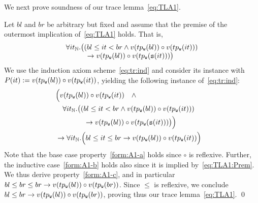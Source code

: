 We next prove soundness of our trace lemma~\eqref{eq:TLA1}.

Let $bl$ and $br$ be arbitrary but fixed and assume that the 
premise of the outermost implication of~\eqref{eq:TLA1}
holds. That is, 
\begin{equation}\label{eq:TLA1:Prem}
\begin{array}{l}
\forall it_{\mathbb{N}}.  \big(( bl\leq it < br \land v(tp_{\texttt{w}}(bl)) \circ v(tp_{\texttt{w}}(it))) \\
\qquad\quad\rightarrow v(tp_{\texttt{w}}(bl)) \circ
v(tp_{\texttt{w}}({\tt s}(it)))\big)
\end{array}
\end{equation}
We use the induction axiom
scheme~\eqref{eq:tr:ind}  and consider its instance
with $P(it) := v(tp_{\texttt{w}}(bl)) \circ v(tp_{\texttt{w}}(it))$,
yielding the following instance of~\eqref{eq:tr:ind}:
\begin{subequations}	
	\begin{align}
	\hspace*{-1em} 	&\Big( v(tp_\pv{w}(bl)) \circ v(tp_\pv{w}(it)) \quad
	\wedge \label{form:A1-a}\\
	\hspace*{-1em} 	&\quad\forall it_{\natsort}. 
	\big(( bl\leq it < br \land v(tp_\pv{w}(bl)) \circ v(tp_\pv{w}(it))) \label{form:A1-b}\\
	\hspace*{-1em} 	&	\qquad\qquad\limp v(tp_\pv{w}(bl)) \circ v(tp_\pv{w}(\suc(it)))\big) \Big)
	\nonumber\\
	\hspace*{-1em} &	\limp\forall it_{\natsort}. \Big(bl\leq it \leq br \limp v(tp_\pv{w}(bl)) \circ v(tp_\pv{w}(it))\Big)\label{form:A1-c}
	\end{align}
\end{subequations} 
Note that  the base case property~\eqref{form:A1-a} holds
since  $\circ$ is reflexive. Further, the inductive
case~\eqref{form:A1-b} holds also  since it is
implied by~\eqref{eq:TLA1:Prem}. We thus derive 
property~\eqref{form:A1-c}, and %
in particular 
$bl\leq br \leq br \rightarrow v(tp_{\texttt{w}}(bl)) \circ
v(tp_{\texttt{w}}(br))$. Since $\leq$ is reflexive, we conclude $bl\leq br \rightarrow v(tp_{\texttt{w}}(bl)) \circ
v(tp_{\texttt{w}}(br))$, proving thus our trace
lemma~\eqref{eq:TLA1}.
\qed


